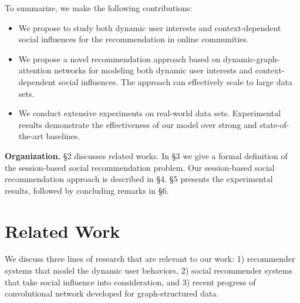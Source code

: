\documentclass[sigconf]{acmart}
\begin{document}
To summarize, we make the following contributions:
\begin{itemize}
\item We propose to study both dynamic user interests and context-dependent social influences for the recommendation in online communities.
\item We propose a novel recommendation approach based on dynamic-graph-attention networks for modeling both dynamic user interests and context-dependent social influences. The approach can effectively scale to large data sets. 
\item We conduct extensive experiments on real-world data sets. Experimental results demonstrate the effectiveness of our model over strong and state-of-the-art baselines.
\end{itemize}

\noindent\textbf{Organization.} \S 2 discusses related works. In \S 3 we give a formal definition of the session-based social recommendation problem. Our session-based social recommendation approach is described in \S 4. \S 5 presents the experimental results, followed by concluding remarks in \S 6. \section{Related Work}
We discuss three lines of research that are relevant to our work: 1) recommender systems that model the dynamic user behaviors, 2) social recommender systems that take social influence into consideration, and 3) recent progress of convolutional network developed for graph-structured data.
\end{document}
